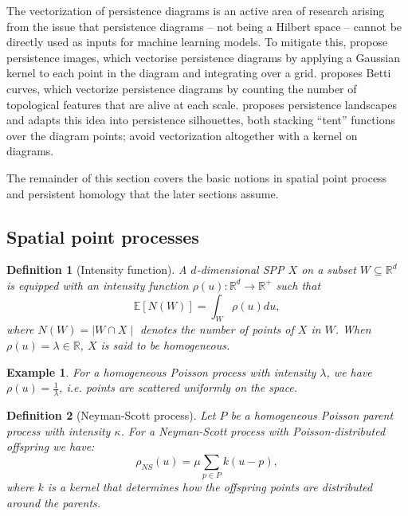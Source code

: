 \documentclass[11pt,a4paper]{article}
\newcommand{\R}{\mathbb{R}}
\newcommand{\E}{\mathbb{E}}
\newcommand{\kpar}{\kappa}
\newcommand{\mo}{\mu}
\theoremstyle{definitioncolon}
\newtheorem{definition}{Definition}[section]
\newtheorem*{example}{Example}
\begin{document}
The vectorization of persistence diagrams is an active area of research arising from the issue
that persistence diagrams -- not being a Hilbert space -- cannot be directly used as inputs for
machine learning models. To mitigate this, \citet{adams2017persistence} propose persistence
images, which vectorise persistence
diagrams by applying a Gaussian kernel to each point in the diagram and integrating over a grid.
\citet{umeda2017time} proposes Betti curves, which vectorize persistence diagrams by counting
the number of topological features
that are alive at each scale.
\citet{bubenik2015landscapes} proposes persistence landscapes and
\citet{chazal2014silhouette} adapts this idea into persistence silhouettes, both stacking ``tent'' functions over the diagram points; \citet{reininghaus2015kernel} avoid vectorization altogether with a kernel on diagrams.

The remainder of this section covers the basic notions in spatial point process and
persistent homology that the later sections assume.

\subsection{Spatial point processes}
\label{ssec:spp}

    \begin{definition}[Intensity function]
    \label{def:intensity}
        A $d$-dimensional SPP $X$ on a subset $W \subseteq \R^d$ is equipped
        with an intensity function $\rho(u): \R^d \rightarrow \R^+$ such that
            \[
            \E[N(W)] = \int_W \rho(u) du,
            \]
        where $N(W) = \mid W \cap X \mid$ denotes the number of points of $X$
        in $W$. When $\rho(u) = \lambda \in \R$, $X$ is said to be
        \emph{homogeneous}.
    \end{definition}

    \begin{example}
        For a homogeneous Poisson process with intensity $\lambda$, we have
        $\rho(u) = \frac{1}{\lambda}$, i.e. points are scattered uniformly on
        the space.
    \end{example}

    \begin{definition}[Neyman-Scott process]
    \label{def:ns}
        Let $P$ be a homogeneous Poisson \emph{parent} process with intensity
        $\kpar$. For a Neyman-Scott process with Poisson-distributed offspring
        we have:
            \[
            \rho_{NS}(u) = \mo \sum_{p \in P} k(u - p),
            \]
        where $k$ is a kernel that determines how the \emph{offspring} points
        are distributed around the parents.
    \end{definition}
\end{document}
